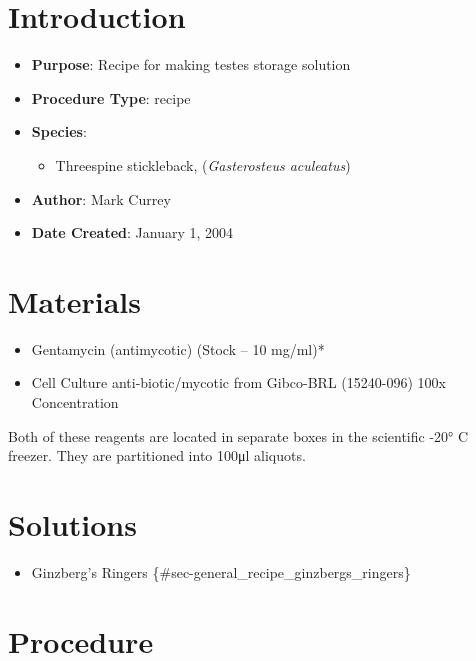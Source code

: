 \documentclass[
  letterpaper,
  DIV=11,
  numbers=noendperiod]{scrreprt}
\providecommand{\tightlist}{%
  \setlength{\itemsep}{0pt}\setlength{\parskip}{0pt}}\usepackage{longtable,booktabs,array}
\begin{document}
\hypertarget{introduction-96}{%
\section{Introduction}\label{introduction-96}}

\begin{itemize}
\tightlist
\item
  \textbf{Purpose}: Recipe for making testes storage solution\\
\item
  \textbf{Procedure Type}: recipe
\item
  \textbf{Species}:

  \begin{itemize}
  \tightlist
  \item
    Threespine stickleback, (\emph{Gasterosteus aculeatus})
  \end{itemize}
\item
  \textbf{Author}: Mark Currey
\item
  \textbf{Date Created}: January 1, 2004
\end{itemize}

\hypertarget{materials-91}{%
\section{Materials}\label{materials-91}}

\begin{itemize}
\tightlist
\item
  Gentamycin (antimycotic) (Stock -- 10 mg/ml)*
\item
  Cell Culture anti-biotic/mycotic from Gibco-BRL (15240-096) 100x
  Concentration
\end{itemize}

Both of these reagents are located in separate boxes in the scientific
-20° C freezer. They are partitioned into 100μl aliquots.

\hypertarget{solutions-82}{%
\section{Solutions}\label{solutions-82}}

\begin{itemize}
\tightlist
\item
  Ginzberg's Ringers \{\#sec-general\_recipe\_ginzbergs\_ringers\}
\end{itemize}

\hypertarget{procedure-90}{%
\section{Procedure}\label{procedure-90}}
\end{document}
